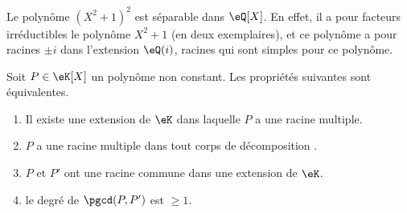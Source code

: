 \begin{example}
	Le polynôme \( (X^2+1)^2\) est séparable dans \( \eQ[X]\). En effet, il a pour facteurs irréductibles le polynôme \( X^2+1\) (en deux exemplaires), et ce polynôme a pour racines \( \pm i\) dans l'extension \( \eQ(i)\), racines qui sont simples pour ce polynôme.
\end{example}

\begin{proposition}  \label{PropolyeZff}
	Soit \( P\in \eK[X]\) un polynôme non constant. Les propriétés suivantes sont équivalentes.
	\begin{enumerate}
		\item\label{ItemdqPFUi}
		Il existe une extension de \( \eK\) dans laquelle \( P\) a une racine multiple.
		\item\label{ItemdqPFUib}
		\( P\) a une racine multiple dans tout corps de décomposition .
		\item\label{ItemdqPFUii}
		\( P\) et \( P'\) ont une racine commune dans une extension de \( \eK\).
		\item\label{ItemdqPFUiii}
		le degré de \( \pgcd(P,P')\) est \( \geq 1\).
	\end{enumerate}
\end{proposition}

